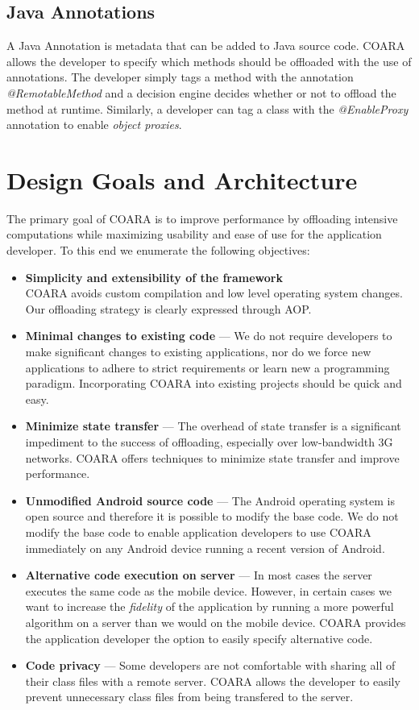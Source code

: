 \documentclass[10pt,journal,cspaper,compsoc]{IEEEtran}
\begin{document}
\subsection{Java Annotations}
A Java Annotation is metadata that can be added to Java source code.  COARA allows the developer to specify which methods should be offloaded with the use of annotations.  The developer simply tags a method with the annotation \emph{@RemotableMethod} and a decision engine decides whether or not to offload the method at runtime.  Similarly, a developer can tag a class with the \emph{@EnableProxy} annotation to enable \emph{object proxies}.


\section{Design Goals and Architecture}
\label{sec:arch}


The primary goal of COARA is to improve performance by offloading intensive computations while maximizing usability and ease of use for the application developer.  To this end we enumerate the following objectives:

\begin{itemize}
\advance\leftskip-.5cm
  \item \textbf{Simplicity and extensibility of the framework}\\COARA avoids custom compilation and low level operating system changes.  Our offloading strategy is clearly expressed through AOP.
  \item \textbf{Minimal changes to existing code} --- We do not require developers to make significant changes to existing applications, nor do we force new applications to adhere to strict requirements or learn new a programming paradigm.  Incorporating COARA into existing projects should be quick and easy.
  \item \textbf{Minimize state transfer} --- The overhead of state transfer is a significant impediment to the success of offloading, especially over low-bandwidth 3G networks.  COARA offers techniques to minimize state transfer and improve performance.
  \item \textbf{Unmodified Android source code} --- The Android operating system is open source and therefore it is possible to modify the base code. We do not modify the base code to enable application developers to use COARA immediately on any Android device running a recent version of Android.
  \item \textbf{Alternative code execution on server} --- In most cases the server executes the same code as the mobile device.  However, in certain cases we want to increase the \emph{fidelity} of the application by running a more powerful algorithm on a server than we would on the mobile device.  COARA provides the application developer the option to easily specify alternative code.
  \item \textbf{Code privacy} --- Some developers are not comfortable with sharing all of their class files with a remote server.  COARA allows the developer to easily prevent unnecessary class files from being transfered to the server.
\end{itemize}
\end{document}
